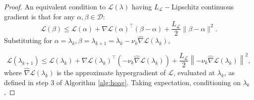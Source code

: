 \documentclass[11pt, twoside]{report}
\begin{document}
\begin{proof}

An equivalent condition to $\mathcal{L}(\lambda)$ having $L_{\mathcal{L}}-$Lipschitz continuous gradient is that for any $\alpha,\beta \in \mathcal{D}:$
\begin{equation} \label{lipschitz_equiv}
    \mathcal{L}(\beta) \leq \mathcal{L}(\alpha) + \nabla \mathcal{L}(\alpha)^\top (\beta - \alpha) + \frac{L_{\mathcal{L}}}{2}\|\beta - \alpha\|^2.
\end{equation}
Substituting for $\alpha = \lambda_k, \beta = \lambda_{k+1} = \lambda_k - \nu_k\widehat{\nabla}\mathcal{L}(\lambda_k)$,

\[\mathcal{L}(\lambda_{k+1}) \leq \mathcal{L}(\lambda_k) + \nabla \mathcal{L}(\lambda_k)^\top \left(-\nu_k\widehat{\nabla}\mathcal{L}(\lambda_k)\right) + \frac{L_{\mathcal{L}}}{2}\left\|-\nu_k\widehat{\nabla}\mathcal{L}(\lambda_k)\right\|^2,\]
where $\widehat{\nabla} \mathcal{L}(\lambda_k)$ is the approximate hypergradient of $\mathcal{L}$, evaluated at $\lambda_k$, as defined in step 3 of Algorithm \ref{alg:hoag}. Taking expectation, conditioning on $\lambda_k$,


\end{proof}
\end{document}
